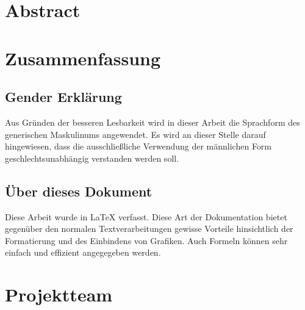 \clearpage

\section*{Abstract}
\label{sec:abstract}

\section*{Zusammenfassung}

\clearpage

\newpage
\thispagestyle{empty}
\mbox{}

\clearpage

\subsection*{Gender Erklärung}
\label{sec:gender-erklaerung}
Aus Gründen der besseren Lesbarkeit wird in dieser Arbeit die Sprachform des generischen Maskulinums angewendet. Es wird an dieser Stelle darauf hingewiesen, dass die ausschließliche Verwendung der männlichen Form geschlechtsunabhängig verstanden werden soll.

\subsection*{Über dieses Dokument}
\label{sec:ueber-dokument}
Diese Arbeit wurde in \LaTeX{} verfasst. Diese Art der Dokumentation bietet gegenüber den normalen Textverarbeitungen gewisse Vorteile hinsichtlich der Formatierung und des Einbindens von Grafiken. Auch Formeln können sehr einfach und effizient angegegeben werden.

\clearpage

\newpage
\thispagestyle{empty}
\mbox{}

\clearpage

\section*{Projektteam}
\label{sec:projektteam}

